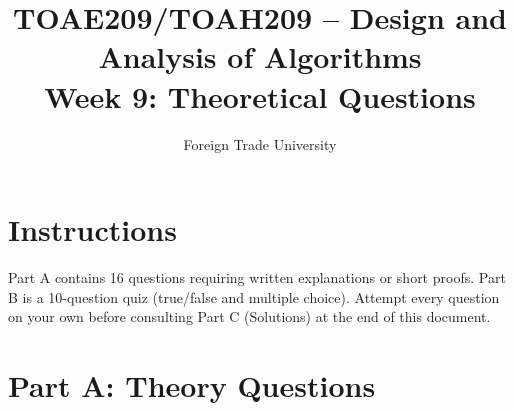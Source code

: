 \documentclass[11pt]{article}
\title{TOAE209/TOAH209 -- Design and Analysis of Algorithms\\[4pt]
\large Week 9: Theoretical Questions}
\author{Foreign Trade University}
\date{}
\begin{document}
\maketitle

\section*{Instructions}

Part A contains 16 questions requiring written explanations or short proofs. Part B is a
10-question quiz (true/false and multiple choice). Attempt every question on your own
before consulting Part C (Solutions) at the end of this document.

\section*{Part A: Theory Questions}
\end{document}
